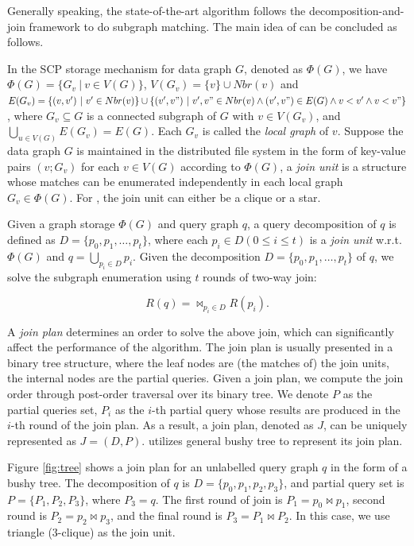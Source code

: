  Generally speaking, the state-of-the-art algorithm \cliquejoin follows the decomposition-and-join framework to do subgraph matching. The main idea of \cliquejoin can be concluded as follows. 

 In the SCP storage mechanism for data graph $G$, denoted as $\Phi(G)$, we have $\Phi(G)=\{G_v\ |\ v\in V(G)\}$, $V(G_v)=\{v\} \cup Nbr(v)$ and $E(G_v)=\{(v,v')\ |\ v'\in Nbr(v)\}\cup\{(v',v")\ |\ v',v"\in Nbr(v)\wedge(v',v")\in E(G)\wedge v<v'\wedge v<v"\}$, where $G_v\subseteq G$ is a connected subgraph of $G$ with $v\in V(G_v)$, and $\bigcup_{u\in V(G)}E(G_v)=E(G)$. Each $G_v$ is called the \textit{local graph} of $v$. Suppose the data graph $G$ is maintained in the distributed file system in the form of key-value pairs $(v;G_v)$ for each $v\in V(G)$ according to $\Phi(G)$, a \textit{join unit} is a structure whose matches can be enumerated independently in each local graph $G_v\in \Phi(G)$. For \cliquejoin, the join unit can either be a clique or a star. 

 Given a graph storage $\Phi(G)$ and query graph $q$, a query decomposition of $q$ is defined as $D=\{p_0,p_1,\dots,p_t\}$, where each $p_i\in D(0\leq i\leq t)$ is a \textit{join unit} w.r.t. $\Phi(G)$ and $q = \bigcup_{p_i\in D}p_i$. Given the decomposition $D=\{p_0,p_1,\dots,p_t\}$ of $q$, we solve the subgraph enumeration using $t$ rounds of two-way join:

\begin{equation} \label{eq:1}
R(q) = \bowtie_{p_i\in D}R(p_i).
\end{equation}

 A \textit{join plan} determines an order to solve the above join, which can significantly affect the performance of the algorithm. The join plan is usually presented in a binary tree structure, where the leaf nodes are (the matches of) the join units, the internal nodes are the partial queries. Given a join plan, we compute the join order through post-order traversal \cite{postorder} over its binary tree. We denote $P$ as the partial queries set, $P_i$ as the $i$-th partial query whose results are produced in the $i$-th round of the join plan. As a result, a join plan, denoted as $J$, can be uniquely represented as $J = (D, P)$. \cliquejoin utilizes general bushy tree \cite{tree} to represent its join plan. \\

\begin{example}
Figure \ref{fig:tree} shows a join plan for an unlabelled query graph $q$ in the form of a bushy tree. The decomposition of $q$ is $D=\{p_0, p_1, p_2, p_3\}$, and partial query set is $P=\{P_1, P_2, P_3\}$, where $P_3=q$. The first round of join is $P_1 = p_0 \Join p_1$, second round is $P_2=p_2 \Join p_3$, and the final round is $P_3 = P_1 \Join P_2$. In this case, we use triangle ($3$-clique) as the join unit.
\end{example}

